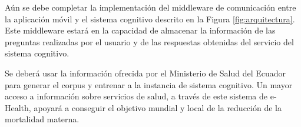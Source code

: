 \documentclass[12pt]{article}
\begin{document}
Aún se debe completar la implementación del middleware de comunicación entre la aplicación móvil y el sistema cognitivo descrito en la Figura \ref{fig:arquitectura}. Este middleware estará en la capacidad de almacenar la información de las preguntas realizadas por el usuario y de las respuestas obtenidas del servicio del sistema cognitivo.

Se deberá usar la información ofrecida por el Ministerio de Salud del Ecuador para generar el corpus y entrenar a la instancia de sistema cognitivo. %
Un mayor acceso a información sobre servicios de salud, a través de este sistema de e-Health, apoyará a conseguir el objetivo mundial y local de la reducción de la mortalidad materna.

%





\end{document}
